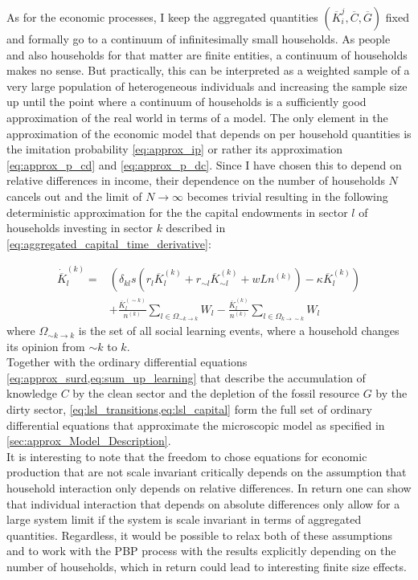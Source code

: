 As for the economic processes, I keep the aggregated quantities $(\overbar{K}_i^j, \overbar{C}, \overbar{G})$ fixed and formally go to a continuum of infinitesimally small households. As people and also households for that matter are finite entities, a continuum of households makes no sense. But practically, this can be interpreted as a weighted sample of a very large population of heterogeneous individuals and increasing the sample size up until the point where a continuum of households is a sufficiently good approximation of the real world in terms of a model. 
The only element in the approximation of the economic model that depends on per household quantities is the imitation probability \cref{eq:approx_ip} or rather its approximation \cref{eq:approx_p_cd} and \cref{eq:approx_p_dc}. Since I have chosen this to depend on relative differences in income, their dependence on the number of households $N$ cancels out and the limit of $N \rightarrow \infty$ becomes trivial resulting in the following deterministic approximation for the the capital endowments in sector $l$ of households investing in sector $k$ described in  \cref{eq:aggregated_capital_time_derivative}:

\begin{align}
  \dot{\overbar{K}}_l^{(k)} = &  \left(\delta_{kl} s\left( r_l \overbar{K}_l^{(k)} + r_{\sim l} \overbar{K}_{\sim l}^{(k)} + w  L n^{(k)} \right) - \kappa \overbar{K}_l^{(k)} \right) \nonumber \\
  &+ \frac{\overbar{K}_l^{(\sim k)}}{n^{(k)}}\sum_{l \in \Omega_{\sim k \rightarrow k}}W_l - \frac{\overbar{K}_l^{(k)}}{n^{(k)}}\sum_{l \in \Omega_{k \rightarrow \sim k}}W_l
  \label{eq:lsl_capital}
\end{align}
where $\Omega_{\sim k \rightarrow k}$ is the set of all social learning events, where a household changes its opinion from $\sim k$ to $k$.\\

Together with the ordinary differential equations \cref{eq:approx_surd,eq:sum_up_learning} that describe the accumulation of knowledge $C$ by the clean sector and the depletion of the fossil resource $G$ by the dirty sector, \cref{eq:lsl_transitions,eq:lsl_capital} form the full set of ordinary differential equations that approximate the microscopic model as specified in \cref{sec:approx_Model_Description}.\\

It is interesting to note that the freedom to chose equations for economic production that are not scale invariant critically depends on the assumption that household interaction only depends on relative differences. In return one can show that individual interaction that depends on absolute differences only allow for a large system limit if the system is scale invariant in terms of aggregated quantities. Regardless, it would be possible to relax both of these assumptions and to work with the PBP process with the results explicitly depending on the number of households, which in return could lead to interesting finite size effects.


